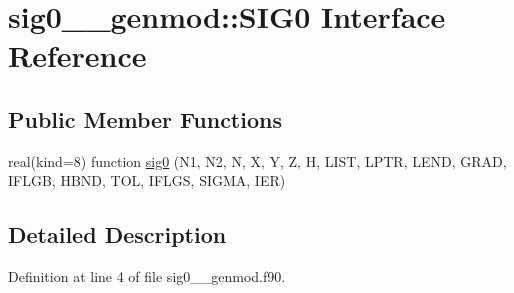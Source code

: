 \hypertarget{interfacesig0____genmod_1_1SIG0}{\section{sig0\+\_\+\+\_\+genmod\+:\+:S\+I\+G0 Interface Reference}
\label{interfacesig0____genmod_1_1SIG0}
}
\subsection*{Public Member Functions}
\begin{DoxyCompactItemize}
\item 
real(kind=8) function \hyperlink{interfacesig0____genmod_1_1SIG0_aeb623569e5eecc4137ae586621ec9097}{sig0} (N1, N2, N, X, Y, Z, H, L\+I\+S\+T, L\+P\+T\+R, L\+E\+N\+D, G\+R\+A\+D, I\+F\+L\+G\+B, H\+B\+N\+D, T\+O\+L, I\+F\+L\+G\+S, S\+I\+G\+M\+A, I\+E\+R)
\end{DoxyCompactItemize}


\subsection{Detailed Description}


Definition at line 4 of file sig0\+\_\+\+\_\+genmod.\+f90.



